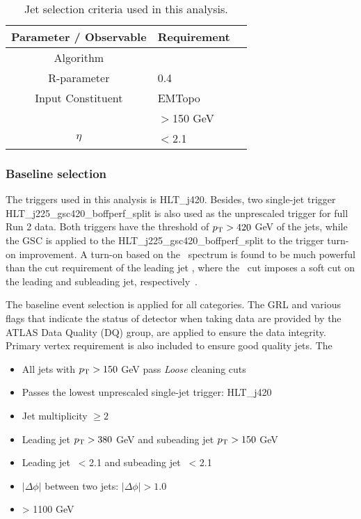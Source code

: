 \begin{table}[ht]
	\centering
		\begin{tabular}{clc}
			\hline
			Parameter / Observable & Requirement \\
			\hline
			Algorithm & \akt \\
			R-parameter & 0.4 \\
			Input Constituent & EMTopo\\
			\pt & $>$150 GeV \\
			\textbar$\eta$\textbar & $<$2.1 \\
			\hline
	\end{tabular}
\caption{Jet selection criteria used in this analysis.}
\label{tab:jetCalibration}
\end{table}


\subsubsection{Baseline selection}
\label{sec:base_selection}


The triggers used in this analysis is HLT\_j420. Besides, two single-jet trigger HLT\_j225\_gsc420\_boffperf\_split is also used as the unprescaled trigger for full Run 2 data. Both triggers have the threshold of $p_{\mathrm{T}} > 420$ GeV of the jets, while the GSC is applied to the HLT\_j225\_gsc420\_boffperf\_split to the trigger turn-on improvement. A turn-on based on the \mjj~spectrum is found to be much powerful than the cut requirement of the leading jet \pt, where the \mjj~cut imposes a soft cut on the leading and subleading jet, respectively~\cite{Nishu:2646455}. %




The baseline event selection is applied for all categories. The GRL and various flags that indicate the status of detector when taking data are provided by the ATLAS Data Quality (DQ) group, are applied to ensure the data integrity. Primary vertex requirement is also included to ensure good quality jets. The  


\begin{itemize}
\item All jets with $p_{\mathrm{T}} > 150$ GeV pass \textit{Loose} cleaning cuts
\item Passes the lowest unprescaled single-jet trigger: HLT\_j420
\item Jet multiplicity $\ge 2$
\item Leading jet $p_{\mathrm{T}} > 380$ GeV and subeading jet $p_{\mathrm{T}} > 150$ GeV
\item Leading jet \abseta~< 2.1 and subeading jet \abseta~< 2.1 
\item $|\Delta\phi|$ between two jets: $|\Delta\phi| > 1.0$
\item \mjj > 1100 GeV
\end{itemize}

